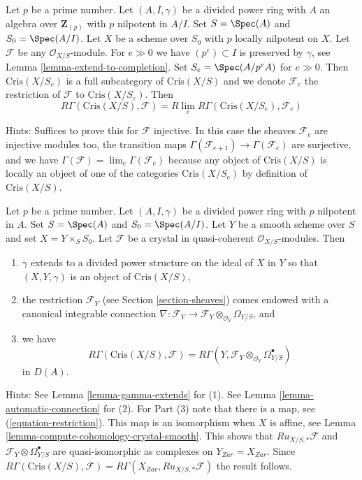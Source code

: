 \begin{remark}[Rlim]
\label{remark-rlim}
Let $p$ be a prime number. Let $(A, I, \gamma)$ be a divided power
ring with $A$ an algebra over $\mathbf{Z}_{(p)}$ with $p$ nilpotent
in $A/I$. Set $S = \Spec(A)$ and $S_0 = \Spec(A/I)$.
Let $X$ be a scheme over $S_0$ with $p$ locally
nilpotent on $X$. Let $\mathcal{F}$ be any
$\mathcal{O}_{X/S}$-module. For $e \gg 0$ we have $(p^e) \subset I$
is preserved by $\gamma$, see
Lemma \ref{lemma-extend-to-completion}.
Set $S_e = \Spec(A/p^eA)$ for $e \gg 0$.
Then $\text{Cris}(X/S_e)$ is a full subcategory of $\text{Cris}(X/S)$
and we denote $\mathcal{F}_e$ the restriction of $\mathcal{F}$ to
$\text{Cris}(X/S_e)$. Then
$$
R\Gamma(\text{Cris}(X/S), \mathcal{F}) =
R\lim_e R\Gamma(\text{Cris}(X/S_e), \mathcal{F}_e)
$$

\medskip\noindent
Hints: Suffices to prove this for $\mathcal{F}$ injective.
In this case the sheaves $\mathcal{F}_e$ are injective
modules too, the transition maps
$\Gamma(\mathcal{F}_{e + 1}) \to \Gamma(\mathcal{F}_e)$ are
surjective, and we have
$\Gamma(\mathcal{F}) = \lim_e \Gamma(\mathcal{F}_e)$ because
any object of $\text{Cris}(X/S)$ is locally an object of one
of the categories $\text{Cris}(X/S_e)$ by definition of
$\text{Cris}(X/S)$.
\end{remark}

\begin{remark}[Comparison]
\label{remark-comparison}
Let $p$ be a prime number. Let $(A, I, \gamma)$ be a divided power
ring with $p$ nilpotent in $A$. Set $S = \Spec(A)$ and
$S_0 = \Spec(A/I)$. Let $Y$ be a smooth scheme over $S$ and set
$X = Y \times_S S_0$. Let
$\mathcal{F}$ be a crystal in quasi-coherent $\mathcal{O}_{X/S}$-modules.
Then
\begin{enumerate}
\item $\gamma$ extends to a divided power structure on the ideal
of $X$ in $Y$ so that $(X, Y, \gamma)$ is an object of $\text{Cris}(X/S)$,
\item the restriction $\mathcal{F}_Y$ (see Section \ref{section-sheaves})
comes endowed with a canonical integrable connection
$\nabla : \mathcal{F}_Y \to
\mathcal{F}_Y \otimes_{\mathcal{O}_Y} \Omega_{Y/S}$, and
\item we have
$$
R\Gamma(\text{Cris}(X/S), \mathcal{F}) =
R\Gamma(Y, \mathcal{F}_Y \otimes_{\mathcal{O}_Y} \Omega^\bullet_{Y/S})
$$
in $D(A)$.
\end{enumerate}

\medskip\noindent
Hints: See Lemma \ref{lemma-gamma-extends} for (1).
See Lemma \ref{lemma-automatic-connection} for (2).
For Part (3) note that there is a map, see
(\ref{equation-restriction}). This map is an isomorphism when
$X$ is affine, see
Lemma \ref{lemma-compute-cohomology-crystal-smooth}.
This shows that $Ru_{X/S, *}\mathcal{F}$ and
$\mathcal{F}_Y \otimes \Omega^\bullet_{Y/S}$ are quasi-isomorphic
as complexes on $Y_{Zar} = X_{Zar}$.
Since $R\Gamma(\text{Cris}(X/S), \mathcal{F}) =
R\Gamma(X_{Zar}, Ru_{X/S, *}\mathcal{F})$ the result follows.
\end{remark}

